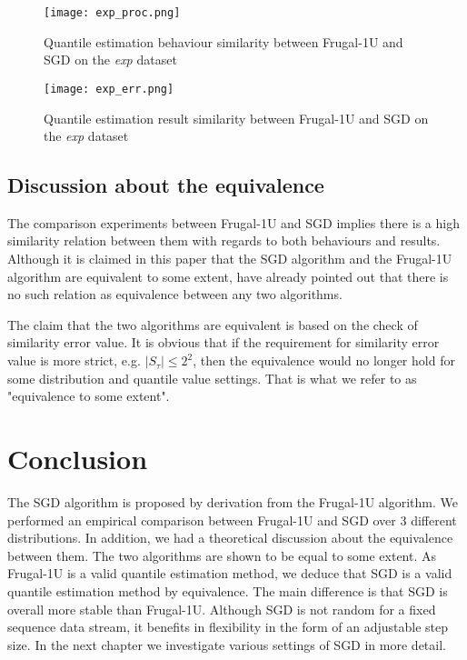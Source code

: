 \begin{figure}[h!]
    \centering
	\texttt{[image: exp\_proc.png]}
    \caption{Quantile estimation behaviour similarity between Frugal-1U and SGD on the \textit{exp} dataset}
    \label{fig: exp_proc}
\end{figure}

\begin{figure}[h!]
    \centering
	\texttt{[image: exp\_err.png]}
    \caption{Quantile estimation result similarity between Frugal-1U and SGD on the \textit{exp} dataset}
    \label{fig: exp_err}
\end{figure}

\subsection{Discussion about the equivalence}

The comparison experiments between Frugal-1U and SGD implies there is a high similarity relation between them with regards to both behaviours and results.
Although it is claimed in this paper that the SGD algorithm and the Frugal-1U algorithm are equivalent to some extent, \citeauthor{blassWhenAreTwo2008}\cite{blassWhenAreTwo2008} have already pointed out that there is no such relation as equivalence between any two algorithms. 

 The claim that the two algorithms are equivalent is based on the check of similarity error value. It is obvious that if the requirement for similarity error value is more strict, e.g. $|S_\tau| \leq 2^2$, then the equivalence would no longer hold for some distribution and quantile value settings. That is what we refer to as "equivalence to some extent".

\section{Conclusion}
The SGD algorithm is proposed by derivation from the Frugal-1U algorithm. We performed an empirical comparison between Frugal-1U and SGD over 3 different distributions. In addition, we had a theoretical discussion about the equivalence between them. The two algorithms are shown to be equal to some extent. As Frugal-1U is a valid quantile estimation method, we deduce that SGD is a valid quantile estimation method by equivalence.
The main difference is that SGD is overall more stable than Frugal-1U.
Although SGD is not random for a fixed sequence data stream, it benefits in flexibility in the form of an adjustable step size.
In the next chapter we investigate various settings of SGD in more detail.